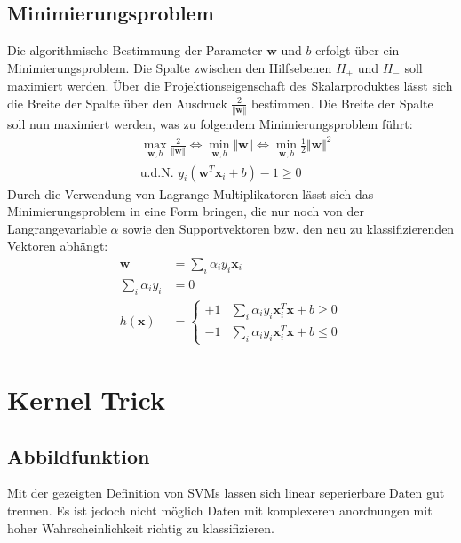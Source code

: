 \documentclass[10pt,a4paper]{scrartcl}
\begin{document}
            \subsection{Minimierungsproblem}
                Die algorithmische Bestimmung der Parameter $\boldsymbol{w}$ und $b$ erfolgt über ein Minimierungsproblem. Die Spalte zwischen den Hilfsebenen $H_+$ und $H_-$ soll maximiert werden. Über die Projektionseigenschaft des Skalarproduktes lässt sich die Breite der Spalte über den Ausdruck $\frac{2}{\Vert \boldsymbol{w} \Vert}$ bestimmen. Die Breite der Spalte soll nun maximiert werden, was zu folgendem Minimierungsproblem führt:
                \begin{align*}
                    & \max_{\boldsymbol{w}, b} \frac{2}{\Vert \boldsymbol{w} \Vert} \Leftrightarrow \min_{\boldsymbol{w}, b} \Vert \boldsymbol{w} \Vert \Leftrightarrow \min_{\boldsymbol{w}, b} \frac{1}{2} \Vert \boldsymbol{w} \Vert^2 \\
                    & \text{u.d.N. } y_i ( \boldsymbol{w}^T \boldsymbol{x}_i + b ) - 1 \geq 0
                \end{align*}
                Durch die Verwendung von Lagrange Multiplikatoren lässt sich das Minimierungsproblem in eine Form bringen, die nur noch von der Langrangevariable $\alpha$ sowie den Supportvektoren bzw. den neu zu klassifizierenden Vektoren abhängt:
                \begin{align*}
                    \boldsymbol{w} &= \sum_i \alpha_i y_i \boldsymbol{x}_i \\
                    \sum_i \alpha_i y_i &= 0 \\
                    h(\boldsymbol{x}) &= \begin{cases}
                        +1 & \sum_i \alpha_i y_i \boldsymbol{x}_i^T \boldsymbol{x} + b \geq 0 \\
                        -1 & \sum_i \alpha_i y_i \boldsymbol{x}_i^T \boldsymbol{x} + b \leq 0
                    \end{cases}
                \end{align*}

        \section{Kernel Trick}
            \subsection{Abbildfunktion}
                Mit der gezeigten Definition von SVMs lassen sich linear seperierbare Daten gut trennen.
                Es ist jedoch nicht möglich Daten mit komplexeren anordnungen mit hoher Wahrscheinlichkeit richtig zu klassifizieren. \\
                
\end{document}
